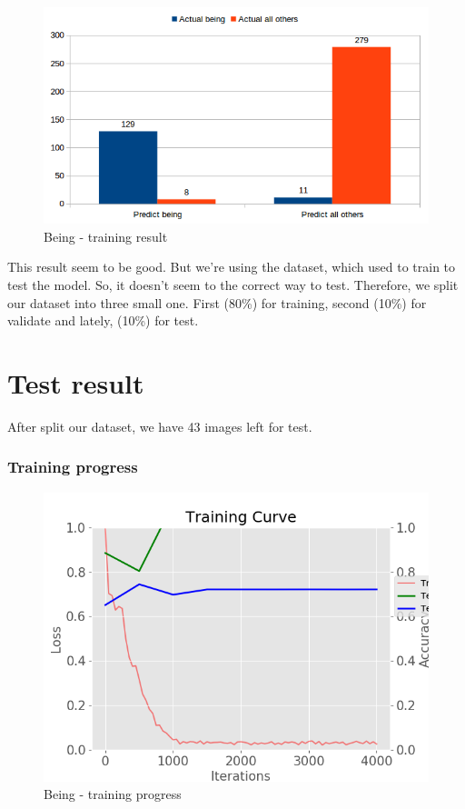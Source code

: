 \documentclass[11pt]{article}
\begin{document}
\begin{figure}[H]
\centering
\includegraphics[width=1\textwidth]{images/omit_other_only_being}
\caption{Being - training result}
\end{figure}

This result seem to be good. But we're using the dataset, which used to train to test the model. So, it doesn't seem to the correct way to test. Therefore, we split our dataset into three small one. First (80\%) for training, second (10\%) for validate and lately, (10\%) for test.

\section{Test result}

After split our dataset, we have 43 images left for test.

\subsubsection{Training progress}

\begin{figure}[H]
\centering
\includegraphics[width=1\textwidth]{images/only_being_43_images}
\caption{Being - training progress}
\end{figure}
\end{document}

